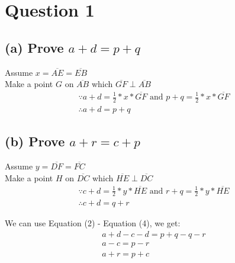 \documentclass[10pt]{article}
\begin{document}
\section{Question 1}
\subsection{(a) Prove $a + d = p + q$}
Assume $x = \overline{AE} = \overline{EB}$ \\
Make a point $G$ on $\overline{AB}$ which $\overline{GF} \perp \overline{AB}$ \\

\begin{gather}
    \because a + d = \frac{1}{2} * x * \overline{GF} \text{ and } p + q = \frac{1}{2} * x * \overline{GF} \\
    \therefore a + d = p + q
\end{gather}

\subsection{(b) Prove $a + r = c + p$}
Assume $y = \overline{DF} = \overline{FC}$ \\
Make a point $H$ on $\overline{DC}$ which $\overline{HE} \perp \overline{DC}$ \\

\begin{gather}
    \because c + d = \frac{1}{2} * y * \overline{HE} \text{ and } r + q = \frac{1}{2} * y * \overline{HE} \\
    \therefore c + d = q + r
\end{gather}

We can use Equation (2) - Equation (4), we get:
\begin{gather}
    a + d - c - d = p + q - q - r \\
    a - c = p - r \\
    a + r = p + c 
\end{gather}
\end{document}
